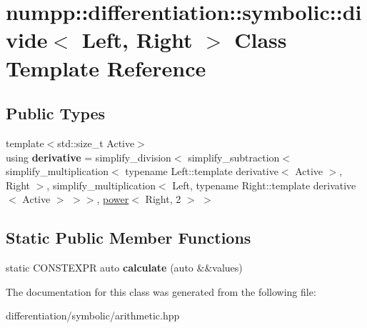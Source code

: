 \hypertarget{classnumpp_1_1differentiation_1_1symbolic_1_1divide}{}\section{numpp\+:\+:differentiation\+:\+:symbolic\+:\+:divide$<$ Left, Right $>$ Class Template Reference}
\label{classnumpp_1_1differentiation_1_1symbolic_1_1divide}
\subsection*{Public Types}
\begin{DoxyCompactItemize}
\item 
\mbox{\label{classnumpp_1_1differentiation_1_1symbolic_1_1divide_ac1d7c214342c5429411607c70c1eba2a}} 
{\footnotesize template$<$std\+::size\+\_\+t Active$>$ }\\using {\bfseries derivative} = simplify\+\_\+division$<$ simplify\+\_\+subtraction$<$ simplify\+\_\+multiplication$<$ typename Left\+::template derivative$<$ Active $>$, Right $>$, simplify\+\_\+multiplication$<$ Left, typename Right\+::template derivative$<$ Active $>$ $>$$>$, \hyperlink{classnumpp_1_1differentiation_1_1symbolic_1_1power}{power}$<$ Right, 2 $>$ $>$
\end{DoxyCompactItemize}
\subsection*{Static Public Member Functions}
\begin{DoxyCompactItemize}
\item 
\mbox{\label{classnumpp_1_1differentiation_1_1symbolic_1_1divide_abcc37b0e5f45acc06b30bef6f1431a5e}} 
static C\+O\+N\+S\+T\+E\+X\+PR auto {\bfseries calculate} (auto \&\&values)
\end{DoxyCompactItemize}


The documentation for this class was generated from the following file\+:\begin{DoxyCompactItemize}
\item 
differentiation/symbolic/arithmetic.\+hpp\end{DoxyCompactItemize}
